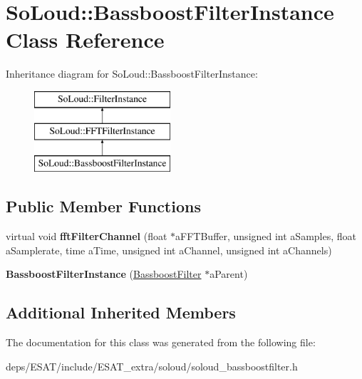 \hypertarget{class_so_loud_1_1_bassboost_filter_instance}{}\section{So\+Loud\+:\+:Bassboost\+Filter\+Instance Class Reference}
\label{class_so_loud_1_1_bassboost_filter_instance}
Inheritance diagram for So\+Loud\+:\+:Bassboost\+Filter\+Instance\+:\begin{figure}[H]
\begin{center}
\leavevmode
\includegraphics[height=3.000000cm]{class_so_loud_1_1_bassboost_filter_instance}
\end{center}
\end{figure}
\subsection*{Public Member Functions}
\begin{DoxyCompactItemize}
\item 
\mbox{\label{class_so_loud_1_1_bassboost_filter_instance_a8e7c282c5e6fbe5220007a7d471d65a8}} 
virtual void {\bfseries fft\+Filter\+Channel} (float $\ast$a\+F\+F\+T\+Buffer, unsigned int a\+Samples, float a\+Samplerate, time a\+Time, unsigned int a\+Channel, unsigned int a\+Channels)
\item 
\mbox{\label{class_so_loud_1_1_bassboost_filter_instance_a3f96f0c9adbb5aba9cfe37a2585607cf}} 
{\bfseries Bassboost\+Filter\+Instance} (\mbox{\hyperlink{class_so_loud_1_1_bassboost_filter}{Bassboost\+Filter}} $\ast$a\+Parent)
\end{DoxyCompactItemize}
\subsection*{Additional Inherited Members}


The documentation for this class was generated from the following file\+:\begin{DoxyCompactItemize}
\item 
deps/\+E\+S\+A\+T/include/\+E\+S\+A\+T\+\_\+extra/soloud/soloud\+\_\+bassboostfilter.\+h\end{DoxyCompactItemize}
